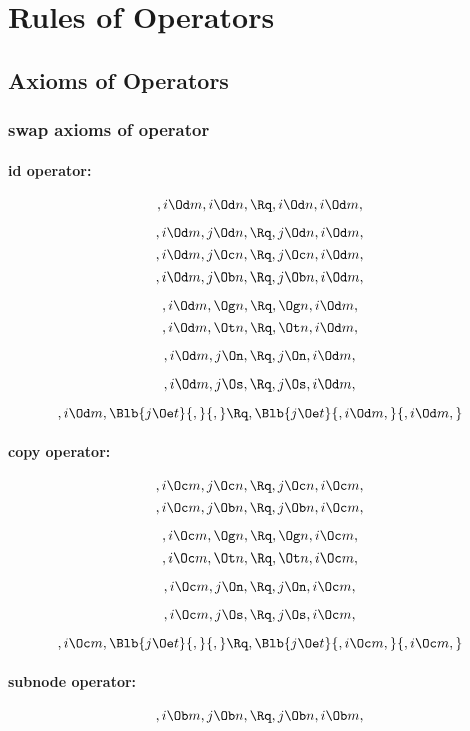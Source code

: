
\chapter{Rules of Operators}

\section{Axioms of Operators}

\subsection{swap axioms of operator}
\subsubsection{id operator:}
\[,i \Od m, i \Od n, \Rq ,i \Od n, i \Od m,\]

\[,i \Od m, j \Od n, \Rq ,j \Od n, i \Od m,\]
\[,i \Od m, j \Oc n, \Rq ,j \Oc n, i \Od m,\]
\[,i \Od m, j \Ob n, \Rq ,j \Ob n, i \Od m,\]

\[,i \Od m,  \Og n, \Rq , \Og n, i \Od m,\]
\[,i \Od m,  \Ot n, \Rq , \Ot n, i \Od m,\]

\[,i \Od m, j \On, \Rq , j \On, i \Od m,\]

\[,i \Od m, j \Os, \Rq , j \Os, i \Od m,\]

\[,i \Od m, \Blb{j \Oe t}{,}{,} \Rq , \Blb{j \Oe t}{,i \Od m,}{,i \Od m,}\]





\bigskip
\subsubsection{copy operator:}
\[,i \Oc m, j \Oc n, \Rq ,j \Oc n, i \Oc m,\]
\[,i \Oc m, j \Ob n, \Rq ,j \Ob n, i \Oc m,\]

\[,i \Oc m,  \Og n, \Rq , \Og n, i \Oc m,\]
\[,i \Oc m,  \Ot n, \Rq , \Ot n, i \Oc m,\]

\[,i \Oc m, j \On, \Rq , j \On, i \Oc m,\]

\[,i \Oc m, j \Os, \Rq , j \Os, i \Oc m,\]

\[,i \Oc m, \Blb{j \Oe t}{,}{,} \Rq , \Blb{j \Oe t}{,i \Oc m,}{,i \Oc m,}\]



\bigskip
\subsubsection{subnode operator:}
\[,i \Ob m, j \Ob n, \Rq ,j \Ob n, i \Ob m,\]

